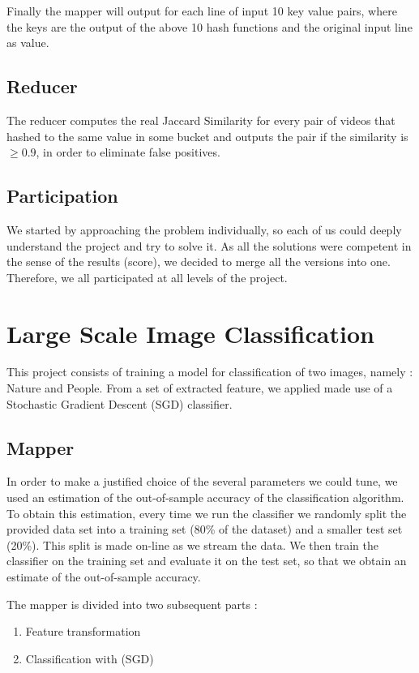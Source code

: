 \documentclass[a4paper, 11pt]{article}
\begin{document}
Finally the mapper will output for each line of input 10 key value pairs, where
the keys are the output of the above 10 hash functions and the original input line
as value.

\subsection{Reducer}

The reducer computes the real Jaccard Similarity for every pair of videos that
hashed to the same value in some bucket and outputs the pair if the similarity
is $\ge 0.9$, in order to eliminate false positives. 

\subsection{Participation}

We started by approaching the problem individually, so each of us could deeply understand the project and try to solve it. As all the solutions were competent in the sense of the results (score), we decided to merge all the versions into one. Therefore, we all participated at all levels of the project.

\newpage




\section{Large Scale Image Classification} 
This project consists of training a model for classification of two images, namely : Nature and People. From a set of extracted feature, we applied made use of a Stochastic Gradient Descent (SGD) classifier.
\subsection{Mapper}

In order to make a justified choice of the several parameters we could tune, we used an estimation of the out-of-sample accuracy of the classification algorithm. To obtain this estimation, every time we run the classifier we randomly split the provided data set into a training set (80\% of the dataset) and a smaller test set (20\%). This split is made on-line as we stream the data. We then train the classifier on the training set and evaluate it on the test set, so that we obtain an estimate of the out-of-sample accuracy.

The mapper is divided into two subsequent parts :
\begin{enumerate}
\item Feature transformation
\item Classification with (SGD)
\end{enumerate}
\end{document}
